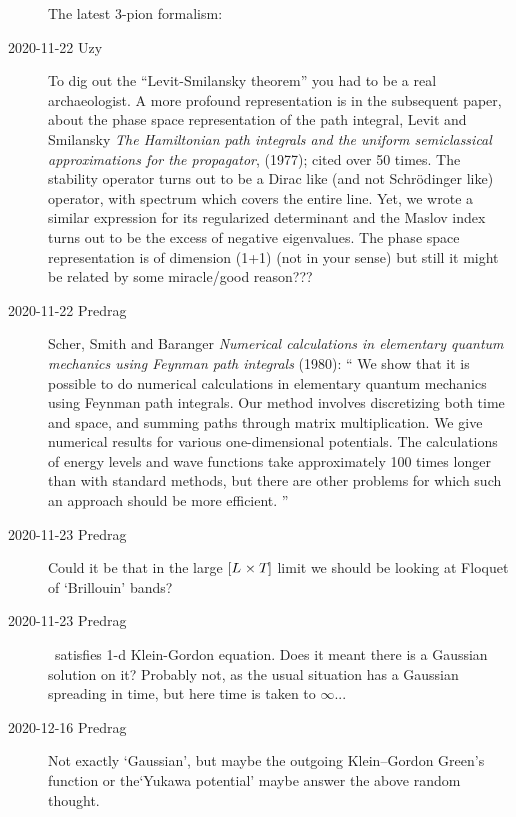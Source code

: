 \begin{description}
The latest 3-pion formalism: 

\item[2020-11-22 Uzy]
To dig out  the ``Levit-Smilansky theorem'' you had to be a real
archaeologist. A more profound representation is in the subsequent paper,
about the phase space representation of the path integral,
Levit and Smilansky {\em The {Hamiltonian} path integrals
and the uniform semiclassical approximations for the propagator}, (1977);
cited over 50 times.
The stability operator turns out to be a Dirac like (and not
Schr\"odinger like) operator, with spectrum which covers the entire line.
Yet, we wrote a similar expression  for its regularized determinant and
the Maslov index turns out to be the excess of negative eigenvalues. The
phase space representation is of dimension (1+1)  (not in your sense) but
still it might be related by some miracle/good reason???

\item[2020-11-22 Predrag]
Scher, Smith and Baranger {\em Numerical calculations in
elementary quantum mechanics using {Feynman} path integrals} (1980): ``
We show that it is possible to do numerical calculations in elementary
quantum mechanics using Feynman path integrals. Our method involves
discretizing both time and space, and summing paths through matrix
multiplication. We give numerical results for various one-dimensional
potentials. The calculations of energy levels and wave functions take
approximately 100 times longer than with standard methods, but there are
other problems for which such an approach should be more efficient.
''

\item[2020-11-23 Predrag]
Could it be that in the large $[{L_{}}\times{\ensuremath{T_{}}}]$ limit
we should be looking at Floquet of `Brillouin' bands?

\item[2020-11-23 Predrag]
\tempLatt\ satisfies 1-d Klein-Gordon equation. Does it meant there is
a Gaussian solution on it? Probably not, as the usual situation has
a Gaussian spreading in time, but here time is taken to $\infty$...

\item[2020-12-16 Predrag] Not exactly `Gaussian', but maybe the outgoing
Klein–Gordon Green's function  or the`Yukawa
potential'  maybe answer the above random thought.


\end{description}
